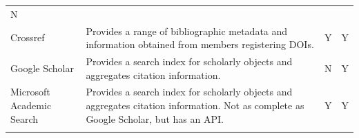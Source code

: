 \documentclass[]{krantz}
\begin{document}
\begin{longtable}[]{@{}llcc@{}}
\begin{minipage}[t]{0.02\columnwidth}
N\strut
\end{minipage}\tabularnewline
\begin{minipage}[t]{0.10\columnwidth}\raggedright\strut
Crossref\strut
\end{minipage} & \begin{minipage}[t]{0.74\columnwidth}\raggedright\strut
Provides a range of bibliographic metadata and information obtained from
members registering DOIs.\strut
\end{minipage} & \begin{minipage}[t]{0.02\columnwidth}\centering\strut
Y\strut
\end{minipage} & \begin{minipage}[t]{0.02\columnwidth}\centering\strut
Y\strut
\end{minipage}\tabularnewline
\begin{minipage}[t]{0.10\columnwidth}\raggedright\strut
Google Scholar\strut
\end{minipage} & \begin{minipage}[t]{0.74\columnwidth}\raggedright\strut
Provides a search index for scholarly objects and aggregates citation
information.\strut
\end{minipage} & \begin{minipage}[t]{0.02\columnwidth}\centering\strut
N\strut
\end{minipage} & \begin{minipage}[t]{0.02\columnwidth}\centering\strut
Y\strut
\end{minipage}\tabularnewline
\begin{minipage}[t]{0.10\columnwidth}\raggedright\strut
Microsoft Academic Search\strut
\end{minipage} & \begin{minipage}[t]{0.74\columnwidth}\raggedright\strut
Provides a search index for scholarly objects and aggregates citation
information. Not as complete as Google Scholar, but has an API.\strut
\end{minipage} & \begin{minipage}[t]{0.02\columnwidth}\centering\strut
Y\strut
\end{minipage} & \begin{minipage}[t]{0.02\columnwidth}\centering\strut
Y\strut
\end{minipage}\tabularnewline
\begin{minipage}[t]{0.10\columnwidth}\raggedright\strut
\strut
\end{minipage} & \begin{minipage}[t]{0.74\columnwidth}\raggedright\strut

\end{minipage}
\end{longtable}
\end{document}
